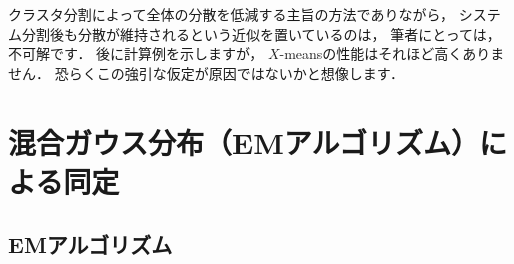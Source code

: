﻿\documentclass{jsarticle}
\begin{document}
クラスタ分割によって全体の分散を低減する主旨の方法でありながら，
システム分割後も分散が維持されるという近似を置いているのは，
筆者にとっては，不可解です．
後に計算例を示しますが，
$X$-meansの性能はそれほど高くありません．
恐らくこの強引な仮定が原因ではないかと想像します．




\section{混合ガウス分布（EMアルゴリズム）による同定}

\subsection{EMアルゴリズム}
\end{document}
